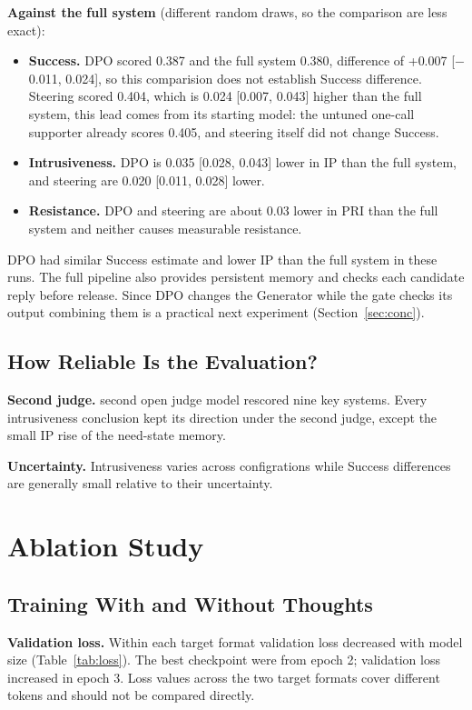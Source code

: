 \documentclass[journal]{IEEEtran}
\begin{document}
\textbf{Against the full system} (different random draws, so the comparison are less exact):
\begin{itemize}
\item \textbf{Success.} DPO scored 0.387 and the full system 0.380, difference of +0.007 [$-$0.011, 0.024], so this comparision does not establish Success difference. Steering scored 0.404, which is 0.024 [0.007, 0.043] higher than the full system, this lead comes from its starting model: the untuned one-call supporter already scores 0.405, and steering itself did not change Success.
\item \textbf{Intrusiveness.} DPO is 0.035 [0.028, 0.043] lower in IP than the full system, and steering are 0.020 [0.011, 0.028] lower.
\item \textbf{Resistance.} DPO and steering are about 0.03 lower in PRI than the full system and neither causes measurable resistance.
\end{itemize}
DPO had similar Success estimate and lower IP than the full system in these runs. The full pipeline also provides persistent memory and checks each candidate reply before release. Since DPO changes the Generator while the gate checks its output combining them is a practical next experiment (Section~\ref{sec:conc}).

\subsection{How Reliable Is the Evaluation?}
\textbf{Second judge.} second open judge model rescored nine key systems. Every intrusiveness conclusion kept its direction under the second judge, except the small IP rise of the need-state memory.

\textbf{Uncertainty.} Intrusiveness varies across configrations while Success differences are generally small relative to their uncertainty.

\FloatBarrier
\section{Ablation Study}
\subsection{Training With and Without Thoughts}\label{sec:a-thoughts}
\textbf{Validation loss.} Within each target format validation loss decreased with model size (Table~\ref{tab:loss}). The best checkpoint were from epoch 2; validation loss increased in epoch 3. Loss values across the two target formats cover different tokens and should not be compared directly.
\end{document}
